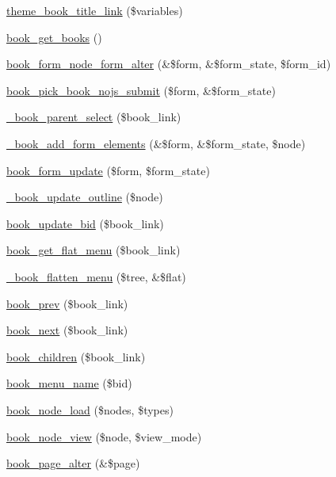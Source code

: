 \begin{DoxyCompactItemize}
\hyperlink{group__themeable_ga81c31dd7bcb8dda4679c9857b95621c8}{theme\_\-book\_\-title\_\-link} (\$variables)
\item 
\hyperlink{book_8module_ab209378421c9f070a4a12e819abf4316}{book\_\-get\_\-books} ()
\item 
\hyperlink{book_8module_a239587a26d87e8231f7af9953a1db4dd}{book\_\-form\_\-node\_\-form\_\-alter} (\&\$form, \&\$form\_\-state, \$form\_\-id)
\item 
\hyperlink{book_8module_af0244d9baf8107c2b7fff3478801f424}{book\_\-pick\_\-book\_\-nojs\_\-submit} (\$form, \&\$form\_\-state)
\item 
\hyperlink{book_8module_a36eb1775bf729cb6af08d2feb4e87116}{\_\-book\_\-parent\_\-select} (\$book\_\-link)
\item 
\hyperlink{book_8module_a9469cb06c59dab8b1238d5fedeadf27d}{\_\-book\_\-add\_\-form\_\-elements} (\&\$form, \&\$form\_\-state, \$node)
\item 
\hyperlink{book_8module_a2790b0d5752cf56b0e06bd2a16a380e1}{book\_\-form\_\-update} (\$form, \$form\_\-state)
\item 
\hyperlink{book_8module_a83ee69e0480634db0ef6a18a7b45d03f}{\_\-book\_\-update\_\-outline} (\$node)
\item 
\hyperlink{book_8module_a0e4082bcf6978b609bbcd7a4adc14aba}{book\_\-update\_\-bid} (\$book\_\-link)
\item 
\hyperlink{book_8module_acf95f70abbeb522883dc96c8ccd9dd4d}{book\_\-get\_\-flat\_\-menu} (\$book\_\-link)
\item 
\hyperlink{book_8module_ac4d0c3cd6d87770f50a6ba3b29292a7e}{\_\-book\_\-flatten\_\-menu} (\$tree, \&\$flat)
\item 
\hyperlink{book_8module_ad576bb53cdddbf776c222d80df42d7f4}{book\_\-prev} (\$book\_\-link)
\item 
\hyperlink{book_8module_a718aa9ca378d5e5086d69607f0cca000}{book\_\-next} (\$book\_\-link)
\item 
\hyperlink{book_8module_a46c88073da9468ea17c29b3615e75143}{book\_\-children} (\$book\_\-link)
\item 
\hyperlink{book_8module_af820b872303e22b111294aa8d61cfdfb}{book\_\-menu\_\-name} (\$bid)
\item 
\hyperlink{book_8module_afc9ff07141ded33f80ec193bf7d2da5a}{book\_\-node\_\-load} (\$nodes, \$types)
\item 
\hyperlink{book_8module_ada015b07f80e70b3ce4b13b2de4a63ec}{book\_\-node\_\-view} (\$node, \$view\_\-mode)
\item 
\hyperlink{book_8module_a0c371bf864f09eaa2090aa92a610c090}{book\_\-page\_\-alter} (\&\$page)

\end{DoxyCompactItemize}
